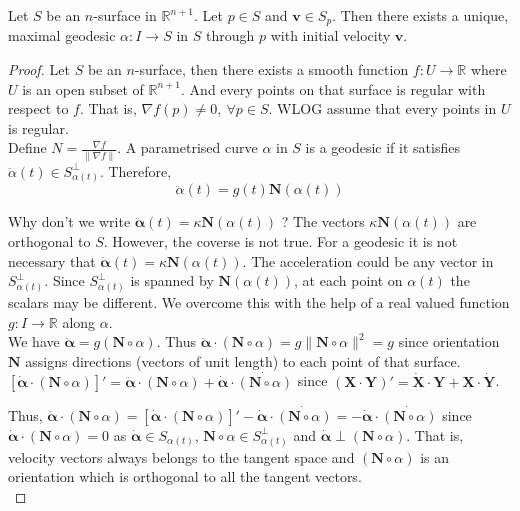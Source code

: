 \begin{theorem}
	Let $S$ be an $n$-surface in $\mathbb{R}^{n+1}$. Let $p \in S$ and $\mathbf{v} \in S_p$. Then there exists a unique, maximal geodesic $\alpha : I \to S$ in $S$ through $p$ with initial velocity $\mathbf{v}$.
\end{theorem}
\begin{proof}
	Let $S$ be an $n$-surface, then there exists a smooth function $f : U \to \mathbb{R}$ where $U$ is an open subset of $\mathbb{R}^{n+1}$. And every points on that surface is regular with respect to $f$. That is, $\nabla f(p) \ne 0,\ \forall p \in S$. WLOG assume that every points in $U$ is regular.\\
	
	Define $N = \frac{\nabla f}{\|\nabla f\|}$. A parametrised curve $\alpha$ in $S$ is a geodesic if it satisfies $\ddot{\alpha}(t) \in S_{\alpha(t)}^\perp$. Therefore,
	\begin{equation}
		\ddot{\alpha}(t) = g(t)\mathbf{N}(\alpha(t))
		\label{eq:acceleration}
	\end{equation}

	Why don't we write $\ddot{\boldsymbol{\alpha}}(t) = \kappa \mathbf{N}(\alpha(t))$ ? The vectors $\kappa \mathbf{N}(\alpha(t))$ are orthogonal to $S$. However, the coverse is not true. For a geodesic it is not necessary that $\ddot{\boldsymbol{\alpha}}(t) =  \kappa \mathbf{N}(\alpha(t))$. The acceleration could be any vector in $S_{\alpha(t)}^\perp$. Since $S_{\alpha(t)}^\perp$ is spanned by $\mathbf{N}(\alpha(t))$, at each point on $\alpha(t)$ the scalars may be different. We overcome this with the help of a real valued function $g : I \to \mathbb{R}$ along $\alpha$.\\

	We have $\ddot{\boldsymbol{\alpha}} = g(\mathbf{N}\circ \alpha)$. Thus $\ddot{\boldsymbol{\alpha}} \cdot (\mathbf{N}\circ\alpha) = g \| \mathbf{N}\circ \alpha \|^2 = g$ since orientation $\mathbf{N}$ assigns directions (vectors of unit length) to each point of that surface.\\

	$\left[\dot{\boldsymbol{\alpha}} \cdot (\mathbf{N} \circ \alpha)\right]' = \ddot{\boldsymbol{\alpha}} \cdot (\mathbf{N} \circ \alpha) + \dot{\boldsymbol{\alpha}} \cdot \dot{(\mathbf{N} \circ \alpha)}$	since $(\mathbf{X} \cdot \mathbf{Y})' = \dot{\mathbf{X}} \cdot \mathbf{Y} + \mathbf{X} \cdot \dot{\mathbf{Y}}$.

	Thus, $\ddot{\boldsymbol{\alpha}} \cdot (\mathbf{N} \circ \alpha) = \left[ \dot{\boldsymbol{\alpha}} \cdot (\mathbf{N} \circ \alpha) \right]' - \dot{\boldsymbol{\alpha}} \cdot \dot{(\mathbf{N} \circ \alpha)} = -\dot{\boldsymbol{\alpha}} \cdot \dot{(\mathbf{N} \circ \alpha)}$ since $\dot{\boldsymbol{\alpha}} \cdot (\mathbf{N} \circ \alpha) = 0$ as $\dot{\boldsymbol{\alpha}} \in S_{\alpha(t)}$, $\mathbf{N} \circ \alpha \in S_{\alpha(t)}^\perp$ and $\dot{\boldsymbol{\alpha}} \perp (\mathbf{N} \circ \alpha)$. That is, velocity vectors always belongs to the tangent space and $(\mathbf{N} \circ \alpha)$ is an orientation which is orthogonal to all the tangent vectors.\\


\end{proof}
